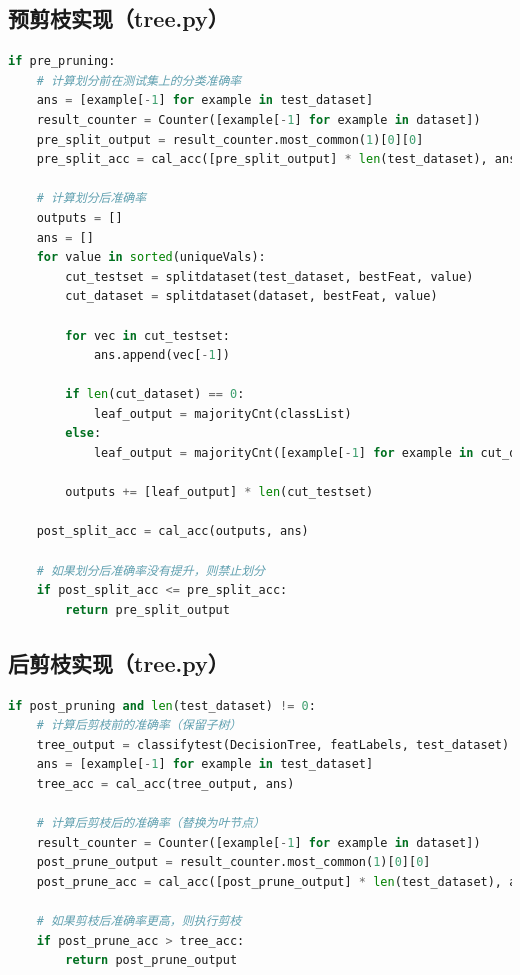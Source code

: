 \documentclass[UTF8]{ctexart}
\begin{document}
\subsection{预剪枝实现（tree.py）}
\begin{lstlisting}[language=Python, caption=预剪枝关键代码]
if pre_pruning:
    # 计算划分前在测试集上的分类准确率
    ans = [example[-1] for example in test_dataset]
    result_counter = Counter([example[-1] for example in dataset])
    pre_split_output = result_counter.most_common(1)[0][0]
    pre_split_acc = cal_acc([pre_split_output] * len(test_dataset), ans)
    
    # 计算划分后准确率
    outputs = []
    ans = []
    for value in sorted(uniqueVals):
        cut_testset = splitdataset(test_dataset, bestFeat, value)
        cut_dataset = splitdataset(dataset, bestFeat, value)
        
        for vec in cut_testset:
            ans.append(vec[-1])
        
        if len(cut_dataset) == 0:
            leaf_output = majorityCnt(classList)
        else:
            leaf_output = majorityCnt([example[-1] for example in cut_dataset])
        
        outputs += [leaf_output] * len(cut_testset)
    
    post_split_acc = cal_acc(outputs, ans)
    
    # 如果划分后准确率没有提升，则禁止划分
    if post_split_acc <= pre_split_acc:
        return pre_split_output
\end{lstlisting}

\subsection{后剪枝实现（tree.py）}
\begin{lstlisting}[language=Python, caption=后剪枝关键代码]
if post_pruning and len(test_dataset) != 0:
    # 计算后剪枝前的准确率（保留子树）
    tree_output = classifytest(DecisionTree, featLabels, test_dataset)
    ans = [example[-1] for example in test_dataset]
    tree_acc = cal_acc(tree_output, ans)
    
    # 计算后剪枝后的准确率（替换为叶节点）
    result_counter = Counter([example[-1] for example in dataset])
    post_prune_output = result_counter.most_common(1)[0][0]
    post_prune_acc = cal_acc([post_prune_output] * len(test_dataset), ans)
    
    # 如果剪枝后准确率更高，则执行剪枝
    if post_prune_acc > tree_acc:
        return post_prune_output
\end{lstlisting}
\end{document}
